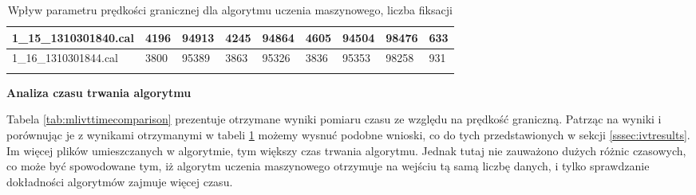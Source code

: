 {\begin{longtable}{l|l|l|l|l|l|l|l|l|}
    \multicolumn{1}{|l|}{1\_15\_1310301840.cal} & 4196 & \cellcolor[HTML]{EFEFEF}94913 & 4245 & \cellcolor[HTML]{EFEFEF}94864 & 4605 & \cellcolor[HTML]{EFEFEF}94504 & 98476 & \cellcolor[HTML]{EFEFEF}633 \\ \hline
    \multicolumn{1}{|l|}{1\_16\_1310301844.cal} & 3800 & \cellcolor[HTML]{EFEFEF}95389 & 3863 & \cellcolor[HTML]{EFEFEF}95326 & 3836 & \cellcolor[HTML]{EFEFEF}95353 & 98258 & \cellcolor[HTML]{EFEFEF}931 \\ \hline
    \caption{Wpływ parametru prędkości granicznej dla algorytmu uczenia maszynowego, liczba fiksacji}
    \label{tab:mlivtfixcomparison}\\
\end{longtable}
}
\textbf{Analiza czasu trwania algorytmu}\par
Tabela \ref{tab:mlivttimecomparison} prezentuje otrzymane wyniki pomiaru czasu ze względu na prędkość graniczną. Patrząc na wyniki i porównując je z wynikami otrzymanymi w tabeli \ref{tab:mlivtfixcomparison} możemy wysnuć podobne wnioski, co do tych przedstawionych w sekcji \ref{sssec:ivtresults}. Im więcej plików umieszczanych w algorytmie, tym większy czas trwania algorytmu. Jednak tutaj nie zauważono dużych różnic czasowych, co może być spowodowane tym, iż algorytm uczenia maszynowego otrzymuje na wejściu tą samą liczbę danych, i tylko sprawdzanie dokładności algorytmów zajmuje więcej czasu.\par
